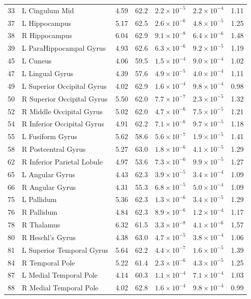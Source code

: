 \documentclass[11pt]{article}
\begin{document}
\begin{longtable}{r p{} r r l l r}
33 & L Cingulum Mid & 4.59 & 62.2 & $2.2\times10^{-5}$ & $2.2\times10^{-4}$ & 1.11 \\
37 & L Hippocampus & 5.17 & 62.5 & $2.6\times10^{-6}$ & $4.8\times10^{-5}$ & 1.25 \\
38 & R Hippocampus & 6.04 & 62.9 & $9.1\times10^{-8}$ & $6.4\times10^{-6}$ & 1.48 \\
39 & L ParaHippocampal Gyrus & 4.93 & 62.6 & $6.3\times10^{-6}$ & $9.2\times10^{-5}$ & 1.19 \\
45 & L Cuneus & 4.06 & 59.5 & $1.5\times10^{-4}$ & $9.0\times10^{-4}$ & 1.02 \\
47 & L Lingual Gyrus & 4.39 & 57.6 & $4.9\times10^{-5}$ & $4.0\times10^{-4}$ & 1.11 \\
49 & L Superior Occipital Gyrus & 4.02 & 62.9 & $1.6\times10^{-4}$ & $9.8\times10^{-4}$ & 0.98 \\
50 & R Superior Occipital Gyrus & 5.50 & 62.0 & $7.7\times10^{-7}$ & $2.3\times10^{-5}$ & 1.32 \\
52 & R Middle Occipital Gyrus & 5.02 & 62.0 & $4.7\times10^{-6}$ & $7.5\times10^{-5}$ & 1.21 \\
54 & R Inferior Occipital Gyrus & 4.91 & 62.2 & $7.1\times10^{-6}$ & $9.7\times10^{-5}$ & 1.18 \\
55 & L Fusiform Gyrus & 5.62 & 58.6 & $5.6\times10^{-7}$ & $1.9\times10^{-5}$ & 1.41 \\
58 & R Postcentral Gyrus & 5.27 & 63.0 & $1.8\times10^{-6}$ & $4.1\times10^{-5}$ & 1.29 \\
62 & R Inferior Parietal Lobule & 4.97 & 53.6 & $7.3\times10^{-6}$ & $9.9\times10^{-5}$ & 1.27 \\
65 & L Angular Gyrus & 4.43 & 62.3 & $3.9\times10^{-5}$ & $3.4\times10^{-4}$ & 1.09 \\
66 & R Angular Gyrus & 4.31 & 55.3 & $6.8\times10^{-5}$ & $5.0\times10^{-4}$ & 1.09 \\
75 & L Pallidum & 5.36 & 62.3 & $1.3\times10^{-6}$ & $3.4\times10^{-5}$ & 1.29 \\
76 & R Pallidum & 4.84 & 62.3 & $8.9\times10^{-6}$ & $1.2\times10^{-4}$ & 1.17 \\
78 & R Thalamus & 6.32 & 61.5 & $3.3\times10^{-8}$ & $4.1\times10^{-6}$ & 1.57 \\
80 & R Heschl's Gyrus & 4.38 & 63.0 & $4.7\times10^{-5}$ & $3.8\times10^{-4}$ & 1.06 \\
81 & L Superior Temporal Gyrus & 5.64 & 62.2 & $4.4\times10^{-7}$ & $1.6\times10^{-5}$ & 1.39 \\
84 & R Temporal Pole & 5.22 & 61.4 & $2.3\times10^{-6}$ & $4.3\times10^{-5}$ & 1.25 \\
87 & L Medial Temporal Pole & 4.14 & 60.3 & $1.1\times10^{-4}$ & $7.1\times10^{-4}$ & 1.03 \\
88 & R Medial Temporal Pole & 4.02 & 62.8 & $1.6\times10^{-4}$ & $9.8\times10^{-4}$ & 0.99 \\
\end{longtable}
\end{document}
